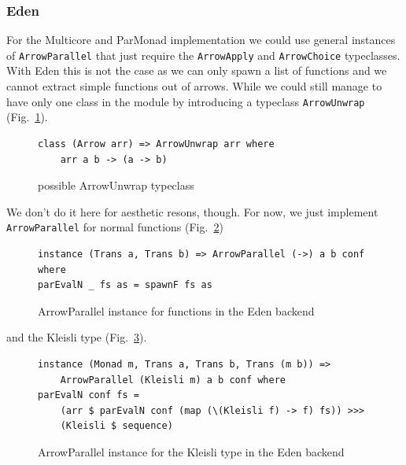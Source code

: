 \documentclass{jfp1}
\newcommand{\inlinecode}[1]{\texttt{#1}}
\begin{document}
\subsubsection{Eden}
For the Multicore and ParMonad implementation we could use general instances of \inlinecode{ArrowParallel} that just require the \inlinecode{ArrowApply} and \inlinecode{ArrowChoice} typeclasses. With Eden this is not the case as we can only spawn a list of functions and we cannot extract simple functions out of arrows. While we could still manage to have only one class in the module by introducing a typeclass \inlinecode{ArrowUnwrap} (Fig.~\ref{fig:ArrowUnwrap}).
\begin{figure}[h]
\begin{lstlisting}[frame=htrbl]
class (Arrow arr) => ArrowUnwrap arr where
	arr a b -> (a -> b)
\end{lstlisting}
\caption{possible ArrowUnwrap typeclass}
\label{fig:ArrowUnwrap}
\end{figure}
We don't do it here for aesthetic resons, though. For now, we just implement \inlinecode{ArrowParallel} for normal functions (Fig.~\ref{fig:ArrowParallelEdenFns})
\begin{figure}[h]
\begin{lstlisting}[frame=htrbl]
instance (Trans a, Trans b) => ArrowParallel (->) a b conf where
parEvalN _ fs as = spawnF fs as
\end{lstlisting}
\caption{ArrowParallel instance for functions in the Eden backend}
\label{fig:ArrowParallelEdenFns}
\end{figure}
and the Kleisli type (Fig.~\ref{fig:ArrowParallelEdenKleisli}).
\begin{figure}[h]
\begin{lstlisting}[frame=htrbl]
instance (Monad m, Trans a, Trans b, Trans (m b)) =>
	ArrowParallel (Kleisli m) a b conf where
parEvalN conf fs =
	(arr $ parEvalN conf (map (\(Kleisli f) -> f) fs)) >>>
	(Kleisli $ sequence)
\end{lstlisting}
\caption{ArrowParallel instance for the Kleisli type in the Eden backend}
\label{fig:ArrowParallelEdenKleisli}
\end{figure}

\FloatBarrier
\end{document}

